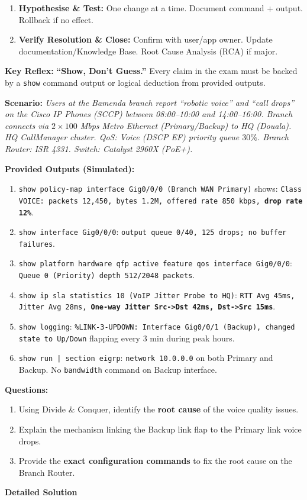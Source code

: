 \documentclass[11pt]{article}
\begin{document}
\begin{methode}
\begin{enumerate}
\begin{itemize}
    \end{itemize}
    \item \textbf{Hypothesise \& Test:} One change at a time. Document command + output. Rollback if no effect.
    \item \textbf{Verify Resolution \& Close:} Confirm with user/app owner. Update documentation/Knowledge Base. Root Cause Analysis (RCA) if major.
\end{enumerate}
\textbf{Key Reflex:} \textbf{``Show, Don't Guess.''} Every claim in the exam must be backed by a \texttt{show} command output or logical deduction from provided outputs.
\end{methode}

\begin{exoresolu}
\textbf{Scenario:} \textit{Users at the Bamenda branch report ``robotic voice'' and ``call drops'' on the Cisco IP Phones (SCCP) between 08:00--10:00 and 14:00--16:00. Branch connects via $2 \times 100$ Mbps Metro Ethernet (Primary/Backup) to HQ (Douala). HQ CallManager cluster. QoS: Voice (DSCP EF) priority queue $30\%$. Branch Router: ISR 4331. Switch: Catalyst 2960X (PoE+).}

\textbf{Provided Outputs (Simulated):}
\begin{enumerate}
    \item \texttt{show policy-map interface Gig0/0/0 (Branch WAN Primary)} shows: \texttt{Class VOICE: packets 12,450, bytes 1.2M, offered rate 850 kbps, \textbf{drop rate 12\%}}.
    \item \texttt{show interface Gig0/0/0}: \texttt{output queue 0/40, 125 drops; no buffer failures}.
    \item \texttt{show platform hardware qfp active feature qos interface Gig0/0/0}: \texttt{Queue 0 (Priority) depth 512/2048 packets}.
    \item \texttt{show ip sla statistics 10 (VoIP Jitter Probe to HQ)}: \texttt{RTT Avg 45ms, Jitter Avg 28ms, \textbf{One-way Jitter Src->Dst 42ms, Dst->Src 15ms}}.
    \item \texttt{show logging}: \texttt{\%LINK-3-UPDOWN: Interface Gig0/0/1 (Backup), changed state to Up/Down} flapping every $3$ min during peak hours.
    \item \texttt{show run | section eigrp}: \texttt{network 10.0.0.0} on both Primary and Backup. No \texttt{bandwidth} command on Backup interface.
\end{enumerate}

\textbf{Questions:}
\begin{enumerate}
    \item Using Divide \& Conquer, identify the \textbf{root cause} of the voice quality issues.
    \item Explain the mechanism linking the Backup link flap to the Primary link voice drops.
    \item Provide the \textbf{exact configuration commands} to fix the root cause on the Branch Router.
\end{enumerate}
\tcblower
\textbf{Detailed Solution}


\end{exoresolu}
\end{document}
